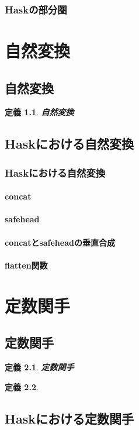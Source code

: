\documentclass{jsbook}
\theoremstyle{plain}
\newtheorem{Def}{定義}[chapter]
\begin{document}
\subsection{Haskの部分圏}
\chapter{自然変換}
\section{自然変換}
\begin{Def}
{\bf 自然変換}
\end{Def}
\section{Haskにおける自然変換}
\subsection{Haskにおける自然変換}
\subsubsection{concat}
\subsubsection{safehead}
\subsubsection{concatとsafeheadの垂直合成}
\subsubsection{flatten関数}

\chapter{定数関手}
\section{定数関手}
\begin{Def}
{\bf 定数関手}
\end{Def}
\begin{Def}
\end{Def}
\section{Haskにおける定数関手}
\end{document}
